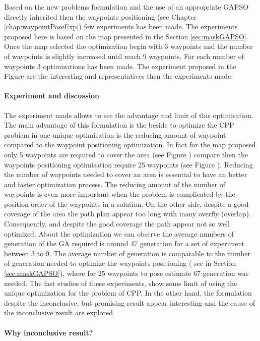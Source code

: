 		
	Based on the new problems formulation and the use of an appropriate GAPSO directly inherited then the waypoints positioning (see Chapter \ref{chap:waypointPoseExp}) few experiments has been made. The experiments proposed here is based on the map presented in the Section \ref{sec:maskGAPSO}.
  Once the map selected the optimization begin with 3 waypoints  and the number of waypoints is slightly increased until reach 9 waypoints. For each number of waypoints  3 optimizations has been made. The experiment proposed in the Figure  are the interesting and representatives then the experiments made. 

	\paragraph*{Experiment and discussion}	
The experiment made allows to see the advantage and limit of this optimisation. 
The main advantage of this formulation is the beside to optimize the CPP problem in one unique optimisation is the reducing amount of waypoint compared to the waypoint positioning optimization. In fact for the map proposed only  5 waypoints are required to cover  the area (see Figure ) compare then the waypoints positioning optimisation require 25 waypoints (see Figure ). Reducing the number of waypoints needed to cover an area is essential to have an better and faster optimization process. The reducing amount of the number of waypoints is even more important when the problem is complicated by the position order of the waypoints in a solution. 
	On the other side, despite a good coverage of the area the path plan appear too long with many overfly (overlap). Consequently, and despite the good  coverage the path appear not so well optimized. 
	About the optimization we can observe the average numbers of generation of the GA required is around 47 generation for a set of experiment between 3 to 9. The average number of generation is  comparable to the number of generation needed to optimize the waypoints positioning ( see in Section \ref{sec:maskGAPSO}), where for 25 waypoints to pose estimate 67 generation was needed. 
	The fast studies of these experiments, show some limit of using the unique optimization for the problem of CPP. In the other hand, the formulation despite the inconclusive, but promising result appear interesting and the cause of the inconclusive result are explored.
	
	\paragraph*{Why inconclusive result?}
			  
